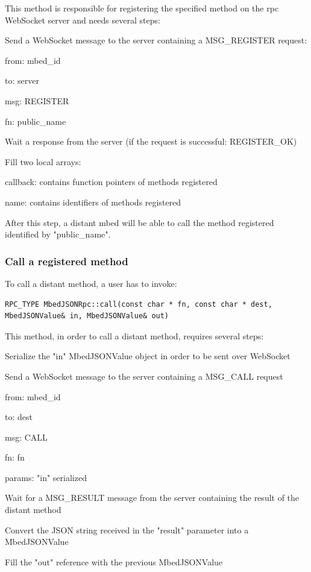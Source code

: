 \documentclass[pdftex,10pt,a4paper]{report}
\newenvironment{packed_item}{
\begin{itemize}
  \setlength{\itemsep}{1pt}
  \setlength{\parskip}{0pt}
  \setlength{\parsep}{0pt}
}{\end{itemize}}
\begin{document}
This method is responsible for registering the specified method on the rpc WebSocket server and needs several steps:
\begin{packed_item}
	\item Send a WebSocket message to the server containing a MSG\_REGISTER request:
	\begin{packed_item}
		\item from: mbed\_id
		\item to: server
		\item msg: REGISTER
		\item fn: public\_name 
	\end{packed_item}
	\item Wait a response from the server (if the request is successful: REGISTER\_OK)
	\item Fill two local arrays:
	\begin{packed_item}
		\item callback: contains function pointers of methods registered
		\item name: contains identifiers of methods registered
	\end{packed_item}
\end{packed_item}


After this step, a distant mbed will be able to call the method registered identified by "public\_name".
    
\subsubsection{Call a registered method}
To call a distant method, a user has to invoke:
\begin{lstlisting}[label=Call a distant method,caption=Call a distant method]
RPC_TYPE MbedJSONRpc::call(const char * fn, const char * dest, MbedJSONValue& in, MbedJSONValue& out)
\end{lstlisting}

This method, in order to call a distant method, requires several steps:
\begin{packed_item}
	\item Serialize the "in" MbedJSONValue object in order to be sent over WebSocket
	\item Send a WebSocket message to the server containing a MSG\_CALL request
	\begin{packed_item}
		\item from: mbed\_id
		\item to: dest
		\item msg: CALL
		\item fn: fn
		\item params: "in" serialized
	\end{packed_item}
	\item Wait for a MSG\_RESULT message from the server containing the result of the distant method
	\item Convert the JSON string received in the "result" parameter into a MbedJSONValue
	\item Fill the "out" reference with the previous MbedJSONValue
\end{packed_item}
\end{document}
